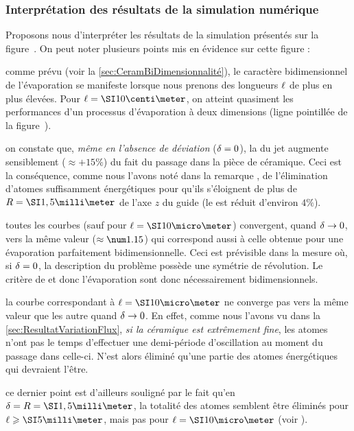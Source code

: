 \casse

\subsubsection{Interprétation des résultats de la simulation numérique}\label{sec:CeramBobineDDEDPUPSimuInterpretation}
\noindent Proposons nous d'interpréter les résultats de la simulation présentés sur la figure~. On peut noter plusieurs points mis en évidence sur cette figure :
\begin{ditemize}
	\item comme prévu (voir la \autoref{sec:CeramBiDimensionnalité}), le caractère bidimensionnel de l'évaporation se manifeste lorsque nous prenons des longueurs ${\ell}$ de plus en plus élevées. Pour $\CeramLong=\cm{10}$, on atteint quasiment les performances d'un processus d'évaporation à deux dimensions (ligne pointillée de la figure~).
	\item on constate que, \emph{même en l'absence de déviation} (${\delta}=0$), la \ddedpup du jet augmente sensiblement ($\approx+15\%$) du fait du passage dans la pièce de céramique. Ceci est la conséquence, comme nous l'avons noté dans la remarque , de l'élimination d'atomes suffisamment énergétiques pour qu'ils s'éloignent de plus de $\CeramRay=\mm{1,5}$ de l'axe $z$ du guide (le \fat est réduit d'environ $4\%$). 
	\item toutes les courbes (sauf pour $\CeramLong=\micron{10}$) convergent, quand ${\delta}\rightarrow0$, vers la même valeur ($\approx\val{1.15}$) qui correspond aussi à celle obtenue pour une évaporation parfaitement bidimensionnelle. Ceci est prévisible dans la mesure où, si ${\delta}=0$, la description du problème possède une symétrie de révolution. Le critère de \fisp et donc l'évaporation sont donc nécessairement bidimensionnels.
	\item la courbe correspondant à $\CeramLong=\micron{10}$ ne converge pas vers la même valeur que les autre quand ${\delta}\rightarrow0$. En effet, comme nous l'avons vu dans la \autoref{sec:ResultatVariationFlux}, \emph{si la céramique est extrêmement fine}, les atomes n'ont pas le temps d'effectuer une demi-période d'oscillation au moment du passage dans celle-ci. N'est alors éliminé qu'une partie des atomes énergétiques qui devraient l'être.
	\item ce dernier point est d'ailleurs souligné par le fait qu'en $\Devi=\CeramRay=\mm{1,5}$, la totalité des atomes semblent être éliminés pour $\CeramLong \geqslant \mm{5}$, mais pas pour $\CeramLong=\micron{10}$ (voir ).
\end{ditemize}



